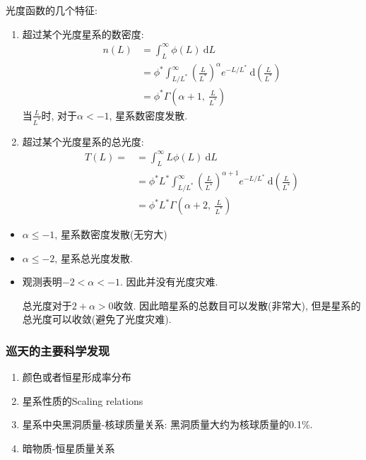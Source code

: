 光度函数的几个特征: 
\begin{enumerate}
    \item 超过某个光度星系的数密度:
    \begin{align*}
        n(L)&=\int_L^{\infty} \phi(L)\ \mathrm{d}L\\
        &=\phi^* \int_{L/L^*}^{\infty} \left(\frac{L}{L^*}\right)^{\alpha}  e^{-L/L^*}\ \mathrm{d} \left(\frac{L}{L^*}\right)\\
        &=\phi^*\Gamma\left( \alpha+1,\ \frac{L}{L^*}\right)
    \end{align*}
    当$\frac{L}{L^*}$时, 对于$\alpha<-1$, 星系数密度发散. 
    \item 超过某个光度星系的总光度: 
    \begin{align*}
        T(L)=&=\int_L^{\infty} L\phi(L)\ \mathrm{d}L\\
        &=\phi^* L^* \int_{L/L^*}^{\infty} \left(\frac{L}{L^*}\right)^{\alpha+1}  e^{-L/L^*}\ \mathrm{d} \left(\frac{L}{L^*}\right)\\
        &=\phi^* L^* \Gamma\left( \alpha+2,\ \frac{L}{L^*}\right)
    \end{align*}
\end{enumerate}
\begin{itemize}
    \item $\alpha\le -1$, 星系数密度发散(无穷大)
    \item $\alpha \le -2$, 星系总光度发散. 
    \item 观测表明$-2<\alpha<-1$. 因此并没有光度灾难. 
    
    总光度对于$2+\alpha>0$收敛. 因此暗星系的总数目可以发散(非常大), 但是星系的总光度可以收敛(避免了光度灾难). 
\end{itemize}

\subsubsection{巡天的主要科学发现}
\begin{enumerate}
    \item 颜色或者恒星形成率分布
    \item 星系性质的Scaling relations
    \item 星系中央黑洞质量-核球质量关系: 黑洞质量大约为核球质量的0.1\%. 
    \item 暗物质-恒星质量关系
\end{enumerate}